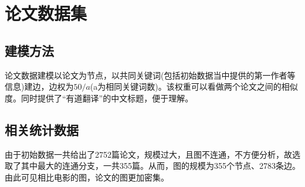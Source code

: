 \documentclass[UTF8, onecolumn, a4paper]{article}
\begin{document}
\section{论文数据集}
\subsection{建模方法}
    论文数据建模以论文为节点，以共同关键词(包括初始数据当中提供的第一作者等信息)建边，边权为$50/a$(a为相同关键词数)。该权重可以看做两个论文之间的相似度。同时提供了“有道翻译”的中文标题，便于理解。
\subsection{相关统计数据}
    由于初始数据一共给出了2752篇论文，规模过大，且图不连通，不方便分析，故选取了其中最大的连通分支，一共355篇。从而，图的规模为355个节点、2783条边。由此可见相比电影的图，论文的图更加密集。
\end{document}
